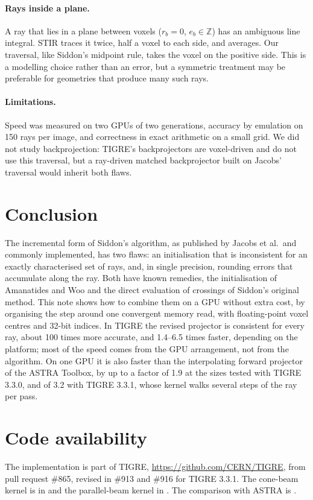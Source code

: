 \documentclass[11pt,a4paper]{article}
\theoremstyle{remark}
\begin{document}
\paragraph{Rays inside a plane.} A ray that lies in a plane between voxels ($r_b=0$, $e_b\in\mathbb Z$) has an
ambiguous line integral. STIR traces it twice, half a voxel to each side, and averages. Our traversal, like
Siddon's midpoint rule, takes the voxel on the positive side. This is a modelling choice rather than an
error, but a symmetric treatment may be preferable for geometries that produce many such rays.

\paragraph{Limitations.} Speed was measured on two GPUs of two generations, accuracy by emulation on 150 rays
per image, and correctness in exact arithmetic on a small grid. We did not study backprojection: TIGRE's backprojectors are voxel-driven and do not use this traversal,
but a ray-driven matched backprojector built on Jacobs' traversal would inherit both flaws.

\section{Conclusion}

The incremental form of Siddon's algorithm, as published by Jacobs et al.\ and commonly implemented, has two
flaws: an initialisation that is inconsistent for an exactly characterised set of rays, and, in single
precision, rounding errors that accumulate along the ray. Both have known remedies, the initialisation of
Amanatides and Woo and the direct evaluation of crossings of Siddon's original method. This note shows how to
combine them on a GPU without extra cost, by organising the step around one convergent memory read, with
floating-point voxel centres and 32-bit indices. In TIGRE the revised projector is consistent for every ray,
about 100 times more accurate, and 1.4--6.5 times faster, depending on the platform; most of the speed comes
from the GPU arrangement, not from the algorithm. On one GPU it is also faster than the interpolating forward
projector of the ASTRA Toolbox, by up to a factor of 1.9 at the sizes tested with TIGRE 3.3.0, and of 3.2 with
TIGRE 3.3.1, whose kernel walks several steps of the ray per pass.

\section*{Code availability}
The implementation is part of TIGRE, \url{https://github.com/CERN/TIGRE}, from pull request \#865, revised in \#913 and \#916 for TIGRE 3.3.1. The cone-beam kernel is in
 and the parallel-beam kernel in .
The comparison with ASTRA is .
\end{document}

